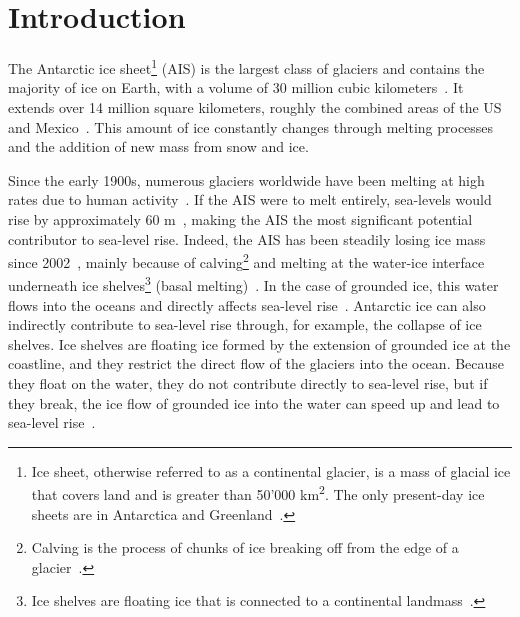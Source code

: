 \documentclass[a4paper,11pt,oneside]{report}
\begin{document}

\maketoc

\chapter{Introduction}


    
    The Antarctic ice sheet\footnote{Ice sheet, otherwise referred to as a continental glacier, is a mass of glacial ice that covers land and is greater than 50'000 \si{km^2}. The only present-day ice sheets are in Antarctica and Greenland~\cite{Icesheet}.} (AIS) is the largest class of glaciers and contains the majority of ice on Earth, with a volume of 30 million cubic kilometers~\cite{Icesheetsquick}. It extends over 14 million square kilometers, roughly the combined areas of the US and Mexico~\cite{AntarcticIceSheet}. This amount of ice constantly changes through melting processes and the addition of new mass from snow and ice. 
    
    Since the early 1900s, numerous glaciers worldwide have been melting at high rates due to human activity~\cite{WWF}. 
    If the AIS were to melt entirely, sea-levels would rise by approximately 60 \si{m}~\cite{Kittel, Fretwell, Morlighem}, making the AIS the most significant potential contributor to sea-level rise. Indeed, the AIS has been steadily losing ice mass since 2002~\cite{Shepherd, Mottram}, mainly because of calving\footnote{Calving is the process of chunks of ice breaking off from the edge of a glacier~\cite{Marshak}.} and melting at the water-ice interface underneath ice shelves\footnote{Ice shelves are floating ice that is connected to a continental landmass~\cite{iceshelvescollapse}.} (basal melting)~\cite{Kittel, Mottram, Rignot}. In the case of grounded ice, this water flows into the oceans and directly affects sea-level rise~\cite{icesheet}. Antarctic ice can also indirectly contribute to sea-level rise through, for example, the collapse of ice shelves. Ice shelves are floating ice formed by the extension of grounded ice at the coastline, and they restrict the direct flow of the glaciers into the ocean. Because they float on the water, they do not contribute directly to sea-level rise, but if they break, the ice flow of grounded ice into the water can speed up and lead to sea-level rise~\cite{Hartley2020, iceshelvescollapse}.  
    
\end{document}
